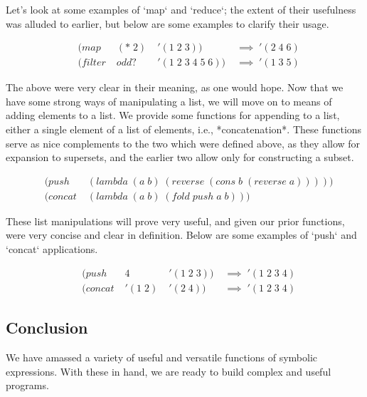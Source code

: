 \documentclass[11pt]{article}
\begin{document}
Let's look at some examples of `map` and `reduce`; the extent of their usefulness was alluded to earlier, but below are some examples to clarify their usage.

\begin{align*}
& (map \; &(* \; 2) \; &'(1 \; 2 \; 3)) \; &\implies \; '(2 \; 4 \; 6)
\\& (filter \; &odd? \; &'(1 \; 2 \; 3 \; 4 \; 5 \; 6)) \; &\implies \; '(1 \; 3 \; 5)
\end{align*}

The above were very clear in their meaning, as one would hope. Now that we have some strong ways of manipulating a list, we will move on to means of adding elements to a list. We provide some functions for appending to a list, either a single element of a list of elements, i.e., *concatenation*. These functions serve as nice complements to the two which were defined above, as they allow for expansion to supersets, and the earlier two allow only for constructing a subset.

\begin{align*}
& (push \; &(lambda \; (a \; b) \; (reverse \; (cons \; b \; (reverse \; a)))))
\\& (concat \; &(lambda \; (a \; b) \; (fold \; push \; a \; b)))
\end{align*}

These list manipulations will prove very useful, and given our prior functions, were very concise and clear in definition. Below are some examples of `push` and `concat` applications.

\begin{align*}
& (push \; &4 \; &'(1 \; 2 \; 3)) \; &\implies \; '(1 \; 2 \; 3 \; 4)
\\& (concat \; &'(1 \; 2) \; &'(2 \; 4)) \; &\implies \; '(1 \; 2 \; 3 \; 4)
\end{align*}

\subsection{Conclusion}
We have amassed a variety of useful and versatile functions of symbolic expressions. With these in hand, we are ready to build complex and useful programs.
\end{document}
